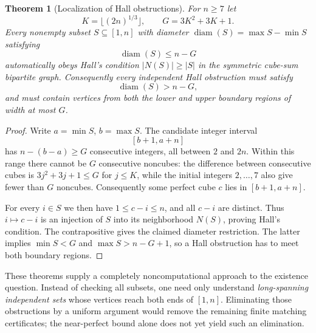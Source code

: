 \documentclass[10pt]{article}
\newtheorem{theorem}{Theorem}
\begin{document}
\begin{theorem}[Localization of Hall obstructions]
\label{thm:obstruction-localization}
For $n\ge7$ let
\[
K=\lfloor(2n)^{1/3}\rfloor,\qquad
G=3K^2+3K+1.
\]
Every nonempty subset $S\subseteq[1,n]$
with diameter
$\operatorname{diam}(S)=\max S-\min S$
satisfying
\[
\boxed{\operatorname{diam}(S)\le n-G}
\]
automatically obeys Hall's condition
$|N(S)|\ge|S|$ in the symmetric
cube-sum bipartite graph.
Consequently \emph{every} independent
Hall obstruction must satisfy
\[
\boxed{\operatorname{diam}(S)>n-G,}
\]
and must contain vertices from both
the lower and upper boundary regions
of width at most $G$.
\end{theorem}
\begin{proof}
Write $a=\min S$, $b=\max S$.
The candidate integer interval
\[
[b+1,a+n]
\]
has $n-(b-a)\ge G$ consecutive
integers, all between $2$ and $2n$.
Within this range there cannot be
$G$ consecutive noncubes: the
difference between consecutive cubes
is $3j^2+3j+1\le G$ for
$j\le K$, while the initial integers
$2,\dots,7$ also give fewer than
$G$ noncubes.
Consequently some perfect cube $c$
lies in $[b+1,a+n]$.

For every $i\in S$ we then have
$1\le c-i\le n$, and all
$c-i$ are distinct.
Thus $i\mapsto c-i$ is an injection
of $S$ into its neighborhood $N(S)$,
proving Hall's condition.
The contrapositive gives the claimed
diameter restriction. The latter implies
$\min S<G$ and $\max S>n-G+1$,
so a Hall obstruction has to meet
both boundary regions.
\end{proof}

These theorems supply a completely
noncomputational approach to the
existence question. Instead of
checking all subsets, one need only
understand \emph{long-spanning
independent sets} whose vertices
reach both ends of $[1,n]$.
Eliminating those obstructions by a
uniform argument would remove the
remaining finite matching certificates;
the near-perfect bound alone does
not yet yield such an elimination.
\end{document}
